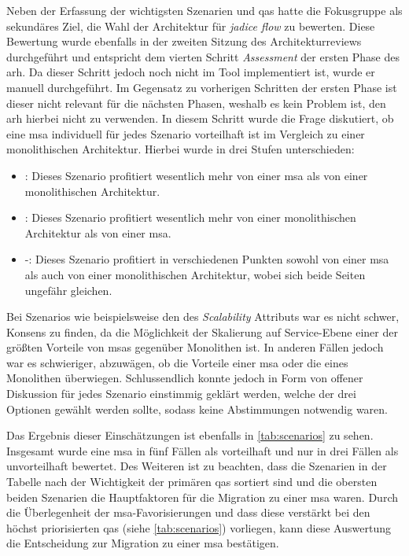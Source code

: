 Neben der Erfassung der wichtigsten Szenarien und \glspl{qa} hatte die Fokusgruppe als sekundäres Ziel, die Wahl der Architektur für \emph{jadice flow} zu bewerten.
Diese Bewertung wurde ebenfalls in der zweiten Sitzung des Architekturreviews durchgeführt und entspricht dem vierten Schritt \emph{Assessment} der ersten Phase des \gls{arh}.
Da dieser Schritt jedoch noch nicht im Tool implementiert ist, wurde er manuell durchgeführt.
Im Gegensatz zu vorherigen Schritten der ersten Phase ist dieser nicht relevant für die nächsten Phasen, weshalb es kein Problem ist, den \gls{arh} hierbei nicht zu verwenden.
In diesem Schritt wurde die Frage diskutiert, ob eine \acrlong{msa} individuell für jedes Szenario vorteilhaft ist im Vergleich zu einer monolithischen Architektur.
Hierbei wurde in drei Stufen unterschieden:
\begin{itemize}
	\item \advantage\hspace*{0.1cm}: Dieses Szenario profitiert wesentlich mehr von einer \gls{msa} als von einer monolithischen Architektur.
	\item \disadvantage\hspace*{0.1cm}: Dieses Szenario profitiert wesentlich mehr von einer monolithischen Architektur als von einer \gls{msa}.
	\item \hspace*{0.27cm}-\hspace*{0.27cm}: Dieses Szenario profitiert in verschiedenen Punkten sowohl von einer \gls{msa} als auch von einer monolithischen Architektur, wobei sich beide Seiten ungefähr gleichen.
\end{itemize}
Bei Szenarios wie beispielsweise den des \emph{Scalability} Attributs war es nicht schwer, Konsens zu finden, da die Möglichkeit der Skalierung auf Service-Ebene einer der größten Vorteile von \glspl{msa} gegenüber Monolithen ist.
In anderen Fällen jedoch war es schwieriger, abzuwägen, ob die Vorteile einer \gls{msa} oder die eines Monolithen überwiegen.
Schlussendlich konnte jedoch in Form von offener  Diskussion für jedes Szenario einstimmig geklärt werden, welche der drei Optionen gewählt werden sollte, sodass keine Abstimmungen notwendig waren.

Das Ergebnis dieser Einschätzungen ist ebenfalls in \cref{tab:scenarios} zu sehen.
Insgesamt wurde eine \gls{msa} in fünf Fällen als vorteilhaft und nur in drei Fällen als unvorteilhaft bewertet.
Des Weiteren ist zu beachten, dass die Szenarien in der Tabelle nach der Wichtigkeit der primären \glspl{qa} sortiert sind und die obersten beiden Szenarien die Hauptfaktoren für die Migration zu einer \acrlong{msa} waren.
Durch die Überlegenheit der \gls{msa}-Favorisierungen und dass diese verstärkt bei den höchst priorisierten \glspl{qa} (siehe \cref{tab:scenarios}) vorliegen, kann diese Auswertung die Entscheidung zur Migration zu einer \gls{msa} bestätigen.

